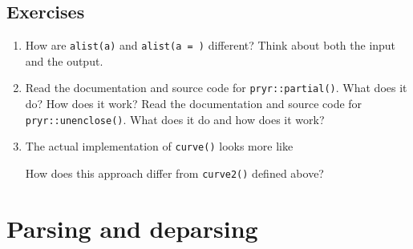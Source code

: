 \hypertarget{exercises-4}{%
\subsection{Exercises}\label{exercises-4}}

\begin{enumerate}
\def\labelenumi{\arabic{enumi}.}
\item
  How are \texttt{alist(a)} and \texttt{alist(a\ =\ )} different? Think
  about both the input and the output.
\item
  Read the documentation and source code for \texttt{pryr::partial()}.
  What does it do? How does it work? Read the documentation and source
  code for \texttt{pryr::unenclose()}. What does it do and how does it
  work?
\item
  The actual implementation of \texttt{curve()} looks more like

\begin{Shaded}
\begin{Highlighting}[]
\StringTok{ } \NormalTok{(}\NormalTok{, }\NormalTok{), } \NormalTok{,}
                    \NormalTok{()) \{}
\StringTok{ }\NormalTok{(}
\OperatorTok{$}\StringTok{ }\NormalTok{(xlim[}\NormalTok{], xlim[}\NormalTok{], }

\StringTok{ }\NormalTok{(}
  \OperatorTok{$} \NormalTok{, }
     \NormalTok{(}
\NormalTok{\}}
\end{Highlighting}
\end{Shaded}

  How does this approach differ from \texttt{curve2()} defined above?
\end{enumerate}

\hypertarget{parsing-and-deparsing}{%
\section{Parsing and deparsing}\label{parsing-and-deparsing}}


